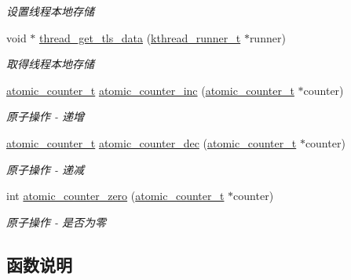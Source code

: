 \begin{DoxyCompactItemize}
\begin{DoxyCompactList}\small\item\em 设置线程本地存储 \end{DoxyCompactList}\item 
void $\ast$ \hyperlink{a00117_gaf5bb2dd001c42fdbdcdcb2048f76ae89_gaf5bb2dd001c42fdbdcdcb2048f76ae89}{thread\+\_\+get\+\_\+tls\+\_\+data} (\hyperlink{a00054_a4f78c259c9527c821f1a6f87495dd339_a4f78c259c9527c821f1a6f87495dd339}{kthread\+\_\+runner\+\_\+t} $\ast$runner)
\begin{DoxyCompactList}\small\item\em 取得线程本地存储 \end{DoxyCompactList}\item 
\hyperlink{a00054_a0d043bbb6b8db19fea54ab9271d352b6_a0d043bbb6b8db19fea54ab9271d352b6}{atomic\+\_\+counter\+\_\+t} \hyperlink{a00117_gade4f41f1cd519f2719b5114ce7801232_gade4f41f1cd519f2719b5114ce7801232}{atomic\+\_\+counter\+\_\+inc} (\hyperlink{a00054_a0d043bbb6b8db19fea54ab9271d352b6_a0d043bbb6b8db19fea54ab9271d352b6}{atomic\+\_\+counter\+\_\+t} $\ast$counter)
\begin{DoxyCompactList}\small\item\em 原子操作 -\/ 递增 \end{DoxyCompactList}\item 
\hyperlink{a00054_a0d043bbb6b8db19fea54ab9271d352b6_a0d043bbb6b8db19fea54ab9271d352b6}{atomic\+\_\+counter\+\_\+t} \hyperlink{a00117_gafc2df03d75cf9168b72e8c5e11953437_gafc2df03d75cf9168b72e8c5e11953437}{atomic\+\_\+counter\+\_\+dec} (\hyperlink{a00054_a0d043bbb6b8db19fea54ab9271d352b6_a0d043bbb6b8db19fea54ab9271d352b6}{atomic\+\_\+counter\+\_\+t} $\ast$counter)
\begin{DoxyCompactList}\small\item\em 原子操作 -\/ 递减 \end{DoxyCompactList}\item 
int \hyperlink{a00117_ga141897cac9743394a99ff7780daa6a80_ga141897cac9743394a99ff7780daa6a80}{atomic\+\_\+counter\+\_\+zero} (\hyperlink{a00054_a0d043bbb6b8db19fea54ab9271d352b6_a0d043bbb6b8db19fea54ab9271d352b6}{atomic\+\_\+counter\+\_\+t} $\ast$counter)
\begin{DoxyCompactList}\small\item\em 原子操作 -\/ 是否为零 \end{DoxyCompactList}\end{DoxyCompactItemize}


\subsection{函数说明}
\hypertarget{a00117_gafc2df03d75cf9168b72e8c5e11953437_gafc2df03d75cf9168b72e8c5e11953437}{}
